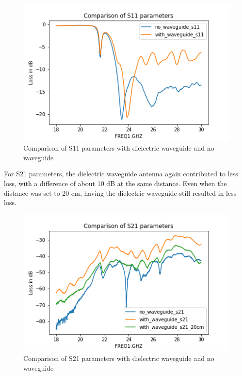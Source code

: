 \documentclass[a4paper,12pt]{report}
\begin{document}
\begin{figure}
  \begin{center}
    \includegraphics[clip, keepaspectratio, width=0.9\linewidth]{img/s11_comparison.png}
    \caption{Comparison of S11 parameters with dielectric waveguide and no waveguide}
    \label{fig:s11_comparison} 
  \end{center}
\end{figure}

For S21 parameters,
the dielectric waveguide antenna again contributed to less loss,
with a difference of about 10 dB at the same distance.
Even when the distance was set to 20 cm,
having the dielectric waveguide still resulted in less loss.

\begin{figure}
  \begin{center}
    \includegraphics[clip, keepaspectratio, width=0.9\linewidth]{img/s21_comparison.png}
    \caption{Comparison of S21 parameters with dielectric waveguide and no waveguide}
    \label{fig:s21_comparison} 
  \end{center}
\end{figure}
\end{document}
